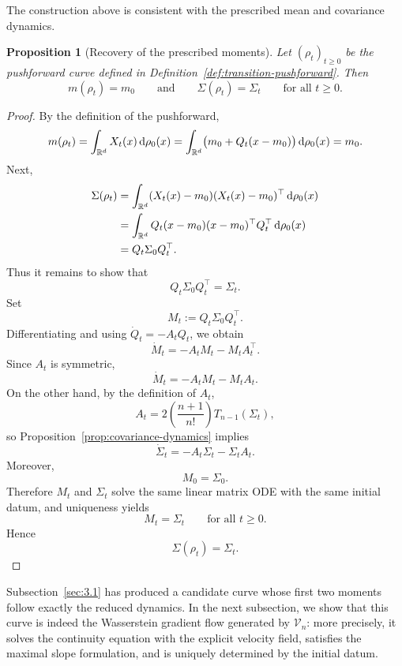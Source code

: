 \documentclass[11pt,reqno]{amsart}
\numberwithin{figure}{section}
\def\d {{\partial}}
\def\d{\mathrm{d}}
\renewcommand{\d}{  {\textup{d}} }
\newtheorem{proposition}{Proposition}[section]
\begin{document}
The construction above is consistent with the prescribed mean and covariance dynamics. 

\begin{proposition}[Recovery of the prescribed moments] \label{prop:pushforward-recovers-moments} Let $(\rho_t)_{t\ge0}$ be the pushforward curve defined in Definition~\ref{def:transition-pushforward}. Then \[ m(\rho_t)=m_0 \qquad\text{and}\qquad \Sigma(\rho_t)=\Sigma_t \qquad\text{for all }t\ge0. \] \end{proposition} 

\begin{proof} 
By  the definition of the pushforward, \[ m(\rho_t) = \int_{\mathbb R^d}X_t(x)\,\d\rho_0(x) = \int_{\mathbb R^d}\bigl(m_0+Q_t(x-m_0)\bigr)\,\d\rho_0(x) = m_0. \] Next, \[ \begin{aligned} \Sigma(\rho_t) &= \int_{\mathbb R^d}(X_t(x)-m_0)(X_t(x)-m_0)^\top\,\d\rho_0(x) \\ &= \int_{\mathbb R^d}Q_t(x-m_0)(x-m_0)^\top Q_t^\top\,\d\rho_0(x) \\ &= Q_t\Sigma_0Q_t^\top. \end{aligned} \] Thus it remains to show that \[ Q_t\Sigma_0Q_t^\top=\Sigma_t. \] Set \[ M_t:=Q_t\Sigma_0Q_t^\top. \] Differentiating and using $\dot Q_t=-A_tQ_t$, we obtain \[ \dot M_t = -A_tM_t-M_tA_t^\top. \] Since $A_t$ is symmetric, \[ \dot M_t=-A_tM_t-M_tA_t. \] On the other hand, by the definition of $A_t$, \[ A_t=2\left(\frac{n+1}{n!}\right)T_{n-1}(\Sigma_t), \] so Proposition~\ref{prop:covariance-dynamics} implies \[ \dot\Sigma_t=-A_t\Sigma_t-\Sigma_tA_t. \] Moreover, \[ M_0=\Sigma_0. \] Therefore $M_t$ and $\Sigma_t$ solve the same linear matrix ODE with the same initial datum, and uniqueness yields \[ M_t=\Sigma_t \qquad\text{for all }t\ge0. \] Hence \[ \Sigma(\rho_t)=\Sigma_t. \] \end{proof}

Subsection~\ref{sec:3.1} has produced a candidate curve whose first two moments follow exactly the reduced dynamics. In the next subsection, we show that this curve is indeed the Wasserstein gradient flow generated by $\mathcal V_n$: more precisely, it solves the continuity equation with the explicit velocity field, satisfies the maximal slope formulation, and is uniquely determined by the initial datum.
\end{document}
